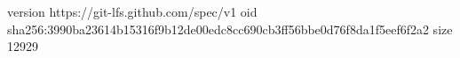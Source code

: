 version https://git-lfs.github.com/spec/v1
oid sha256:3990ba23614b15316f9b12de00edc8cc690cb3ff56bbe0d76f8da1f5eef6f2a2
size 12929
